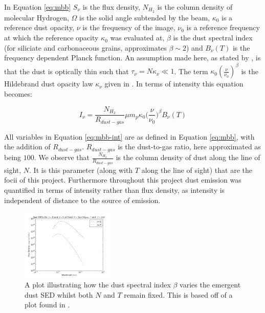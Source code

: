 \documentclass{report}
\begin{document}
In Equation \ref{eq:mbb} $S_{\nu}$ is the flux density, $N_{H_{2}}$ is the column density of molecular Hydrogen, $\Omega$ is the solid angle subtended by the beam, $\kappa_{0}$ is a reference dust opacity, $\nu$ is the frequency of the image, $\nu_{0}$ is a reference frequency at which the reference opacity $\kappa_{0}$ was evaluated at, $\beta$ is the dust spectral index (for siliciate and carbonaceous grains, \textcite{beta} approximates $\beta \sim 2$) and $B_{\nu}(T)$ is the frequency dependent Planck function. An assumption made here, as stated by \textcite{kelly}, is that the dust is optically thin such that
$\tau_{\nu} = N\kappa_{\nu} \ll 1$. The term $\kappa_{0}(\frac{\nu}{\nu_{0}})^{\beta}$ is the Hildebrand dust opacity law $\kappa_{\nu}$ given in \textcite{dustopacity}. In terms of intensity this equation becomes:

\begin{equation}
  I_{\nu} = \frac{N_{H_{2}}}{R_{dust-gas}} \mu m_{p} \kappa_{0} \Big(\frac{\nu}{\nu_{0}}\Big)^{\beta} B_{\nu}(T)
   \label{eq:mbb-int}
\end{equation}

All variables in Equation \ref{eq:mbb-int} are as defined in Equation \ref{eq:mbb}, with the addition of $R_{dust-gas}$. $R_{dust-gas}$ is the dust-to-gas ratio, here approximated as being $100$. We observe that $\frac{N_{H_{2}}}{R_{dust-gas}}$ is the column density of dust along the line of sight, $N$. It is this parameter (along with $T$ along the line of sight) that are the focii of this project. Furthermore throughout this project dust emission was quantified in terms of intensity rather than flux density, as intensity is independent of distance to the source of emission.

\begin{figure}
    \includegraphics[width=0.4\textwidth]{../img/flux_density_combined.png}
    \caption[A plot illustrating how the dust spectral index $\beta$ varies the emergent dust SED whilst both $N$ and $T$ remain fixed. This is based off of a plot found in \textcite{noise}.]{A plot illustrating how the dust spectral index $\beta$ varies the emergent dust SED whilst both $N$ and $T$ remain fixed. This is based off of a plot found in \textcite{noise}.}
     \label{fig:beta-ex}
\end{figure}
\end{document}
